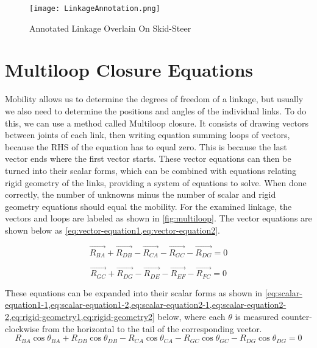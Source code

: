 \documentclass[hidelinks]{article}
\begin{document}
    \begin{figure}[t]
        \centering
        \texttt{[image: LinkageAnnotation.png]}
        \caption{Annotated Linkage Overlain On Skid-Steer}\label{fig:AnnotatedLinkage}
    \end{figure}

    \FloatBarrier\section*{Multiloop Closure Equations}
    Mobility allows us to determine the degrees of freedom of a linkage, but usually we also need to determine the positions and angles of the individual links. To do this, we can use a method called Multiloop closure. It consists of drawing vectors between joints of each link, then writing equation summing loops of vectors, because the RHS of the equation has to equal zero. This is because the last vector ends where the first vector starts. These vector equations can then be turned into their scalar forms, which can be combined with equations relating rigid geometry of the links, providing a system of equations to solve. When done correctly, the number of unknowns minus the number of scalar and rigid geometry equations should equal the mobility. For the examined linkage, the vectors and loops are labeled as shown in \autoref{fig:multiloop}. The vector equations are shown below as \cref{eq:vector-equation1,eq:vector-equation2}.
    
    \begin{equation}
        \label{eq:vector-equation1}
        \vec{R_{BA}}+\vec{R_{DB}}-\vec{R_{CA}}-\vec{R_{GC}}-\vec{R_{DG}}=0
    \end{equation}

    \begin{equation}
        \label{eq:vector-equation2}
        \vec{R_{GC}}+\vec{R_{DG}}-\vec{R_{DE}}-\vec{R_{EF}}-\vec{R_{FC}}=0
    \end{equation}

    These equations can be expanded into their scalar forms as shown in \cref{eq:scalar-equation1-1,eq:scalar-equation1-2,eq:scalar-equation2-1,eq:scalar-equation2-2,eq:rigid-geometry1,eq:rigid-geometry2} below, where each \(\theta\) is measured counter-clockwise from the horizontal to the tail of the corresponding vector. 
    \begin{equation}
        \label{eq:scalar-equation1-1}
        R_{BA}\cos\theta_{BA}+R_{DB}\cos\theta_{DB}-R_{CA}\cos\theta_{CA}-R_{GC}\cos\theta_{GC}-R_{DG}\cos\theta_{DG}=0
    \end{equation}
\end{document}
